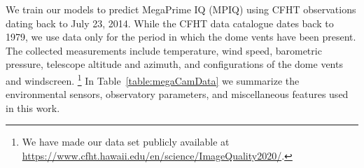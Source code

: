 
We train our models to predict MegaPrime IQ (MPIQ) using CFHT observations dating back to July 23, 2014.  While the CFHT data catalogue dates back to 1979, we use  data only for the period in which the dome vents have been present.
 The collected measurements include temperature, wind speed, barometric pressure, telescope altitude and azimuth, and configurations of the dome vents and windscreen. \footnote{We have made our data set publicly available at \url{https://www.cfht.hawaii.edu/en/science/ImageQuality2020/}.}  In Table~\ref{table:megaCamData} we summarize the environmental sensors, observatory parameters, and miscellaneous features used in this work.  %

